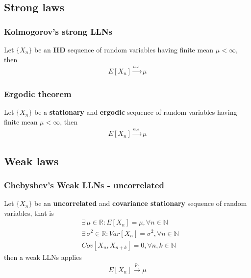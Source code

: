 \documentclass[../main.tex]{subfiles}
\begin{document}
\subsection{Strong laws}
\subsubsection{Kolmogorov's strong LLNs}
Let $\{X_n\}$ be an \textbf{IID} sequence of random variables having finite mean $\mu < \infty$, then
\begin{align*}
    E[X_n] \xrightarrow{a. s.} \mu
\end{align*}

\subsubsection{Ergodic theorem}
Let $\{X_n\}$ be a \textbf{stationary} and \textbf{ergodic} sequence of random variables having finite mean $\mu < \infty$, then
\begin{align*}
    E[X_n] \xrightarrow{a. s.} \mu
\end{align*}

\subsection{Weak laws}
\subsubsection{Chebyshev's Weak LLNs - uncorrelated}
Let $\{X_n\}$ be an \textbf{uncorrelated} and \textbf{covariance stationary} sequence of random variables, that is
\begin{align*}
    &\exists\, \mu \in \mathbb{R}: E[X_n] = \mu, \forall n \in \mathbb{N} \\
    &\exists\, \sigma^2 \in \mathbb{R}: Var[X_n] = \sigma^2, \forall n \in \mathbb{N} \\
    & Cov[X_n, X_{n+k}] = 0, \forall n,k \in \mathbb{N}
\end{align*}
then a weak LLNs applies
\begin{align*}
    E[X_n] \xrightarrow{p.} \mu
\end{align*}
\end{document}
